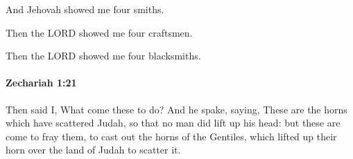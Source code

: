 			\begin{versebox}
					\item[BHS] 
					\item[LXX] 
					\item[ASV] And Jehovah showed me four smiths.
					\item[NIV] Then the LORD showed me four craftsmen.
					\item[NRSV] Then the LORD showed me four blacksmiths.
			\end{versebox}

		\paragraph{Zechariah 1:21} %
			\label{ZECHARIAH-1-21}

			Then said I, What come these to do? And he spake, saying, These are the horns which have scattered Judah, so that no man did lift up his head: but these are come to fray them, to cast out the horns of the Gentiles, which lifted up their horn over the land of Judah to scatter it.

